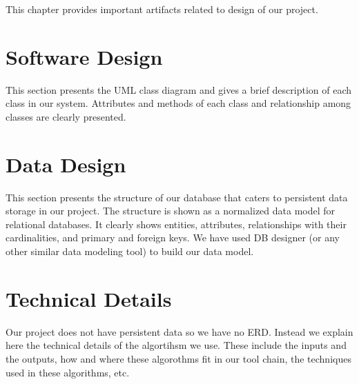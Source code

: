 
This chapter provides important artifacts related to design of our project.

\section{Software Design}

This section presents the UML class diagram and gives a brief description of each class in our system. Attributes and methods of each class and relationship among classes are clearly presented.


\section{Data Design}

This section presents the structure of our database that caters to persistent data storage in our project. The structure is shown as a normalized data model for relational databases. It clearly shows entities, attributes, relationships with their cardinalities, and primary and foreign keys. We have used DB designer (or any other similar data modeling tool) to build our data model.

 
\section{Technical Details}

Our project does not have persistent data so we have no ERD. Instead we explain here the technical details of the algortihsm we use. These include the inputs and the outputs, how and where these algorothms fit in our tool chain, the techniques used in these algorithms, etc.